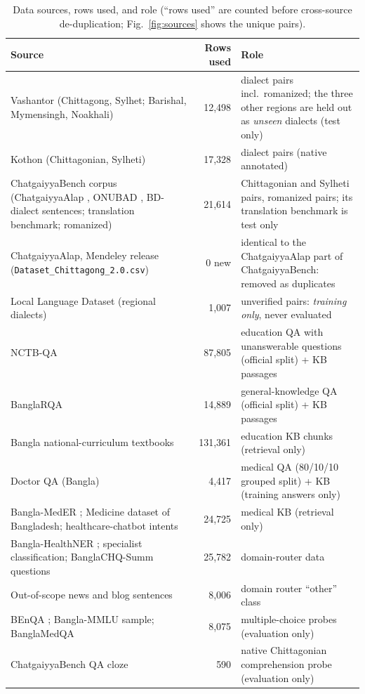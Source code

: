 \begin{table}[!t]
\centering
\caption{Data sources, rows used, and role (``rows used'' are counted before cross-source de-duplication; Fig.~\ref{fig:sources} shows the unique pairs).}
\label{tab:datasets}
\scriptsize
\begin{tabularx}{\textwidth}{@{}L{7.2cm} r Y@{}}
\toprule
Source & Rows used & Role \\
\midrule
Vashantor \cite{faria2023vashantor} (Chittagong, Sylhet; Barishal, Mymensingh, Noakhali) & 12,498 & dialect pairs incl.\ romanized; the three other regions are held out as \emph{unseen} dialects (test only) \\
Kothon \cite{kothon2026} (Chittagonian, Sylheti) & 17,328 & dialect pairs (native annotated) \\
ChatgaiyyaBench corpus \cite{chatgaiyyabench2026} (ChatgaiyyaAlap \cite{chatgaiyyaalap2025}, ONUBAD \cite{sultana2025onubad}, BD-dialect sentences; translation benchmark; romanized) & 21,614 & Chittagonian and Sylheti pairs, romanized pairs; its translation benchmark is test only \\
ChatgaiyyaAlap, Mendeley release (\texttt{Dataset\_Chittagong\_2.0.csv}) & 0 new & identical to the ChatgaiyyaAlap part of ChatgaiyyaBench: removed as duplicates \\
Local Language Dataset (regional dialects) & 1,007 & unverified pairs: \emph{training only}, never evaluated \\
NCTB-QA \cite{nctbqa} & 87,805 & education QA with unanswerable questions (official split) + KB passages \\
BanglaRQA \cite{ekram2022banglarqa} & 14,889 & general-knowledge QA (official split) + KB passages \\
Bangla national-curriculum textbooks & 131,361 & education KB chunks (retrieval only) \\
Doctor QA (Bangla) & 4,417 & medical QA (80/10/10 grouped split) + KB (training answers only) \\
Bangla-MedER \cite{aurpa2026banglameder}; Medicine dataset of Bangladesh; healthcare-chatbot intents & 24,725 & medical KB (retrieval only) \\
Bangla-HealthNER \cite{khan2023nervous}; specialist classification; BanglaCHQ-Summ questions \cite{khan2023banglachqsumm} & 25,782 & domain-router data \\
Out-of-scope news and blog sentences & 8,006 & domain router ``other'' class \\
BEnQA \cite{shafayat2024benqa}; Bangla-MMLU sample; BanglaMedQA \cite{banglamedqa} & 8,075 & multiple-choice probes (evaluation only) \\
ChatgaiyyaBench QA cloze & 590 & native Chittagonian comprehension probe (evaluation only) \\
\bottomrule
\end{tabularx}
\end{table}

